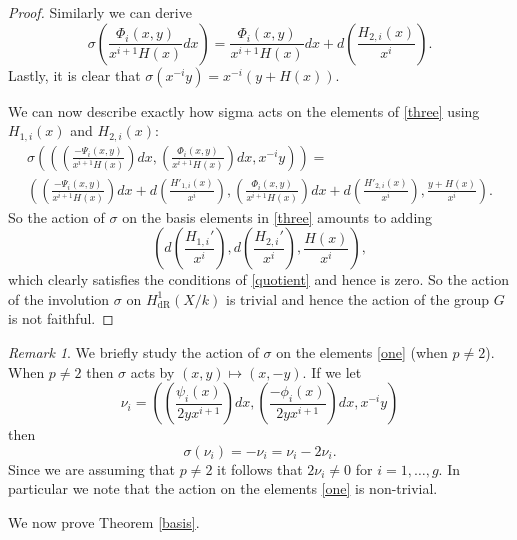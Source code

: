 \documentclass[draft, 11pt]{article} %
\theoremstyle{plain}
\theoremstyle{remark}
\newtheorem*{rem}{Remark}
\newcommand{\derhamhone}{H_{\text {dR}}^1(X/k)}
\begin{document}
\begin{proof}
Similarly we can derive
\begin{equation*}
\sigma \left( \frac{\Phi_i(x,y)}{x^{i+1}H(x)} dx \right)  = \frac{\Phi_i(x,y)}{x^{i+1}H(x)} dx + d \left( \frac{H_{2,i}(x)}{x^i} \right).
\end{equation*}
Lastly, it is clear that $\sigma(x^{-i}y) = x^{-i}(y+H(x))$.


We can now describe exactly how sigma acts on the elements of \eqref{three} using $H_{1,i}(x)$ and $H_{2,i}(x)$:
\begin{multline}
\sigma \left( \left( \left(\frac{-\Psi_i(x,y)}{x^{i+1}H(x)}\right) dx, \left( \frac{\Phi_i(x,y)}{x^{i+1}H(x)} \right) dx, x^{-i}y \right)\right) = \\
 \left( \left(\frac{-\Psi_i(x,y)}{x^{i+1}H(x)} \right) dx + d\left(\frac{H'_{1,i}(x)}{x^i}\right),  \left( \frac{\Phi_i(x,y)}{x^{i+1}H(x)} \right) dx+ d\left(\frac{H'_{2,i}(x)}{x^i} \right), \frac{y+H(x)}{x^i} \right).
\end{multline}
So the action of $\sigma$ on the basis elements in \eqref{three} amounts to adding 
\[
\left( d\left(\frac{H_{1,i}'}{x^i}\right), d\left(\frac{H_{2,i}'}{x^i}\right), \frac{H(x)}{x^i} \right),
\]
which clearly satisfies the conditions of \eqref{quotient} and hence is zero.
So the action of the involution $\sigma$ on $\derhamhone$ is trivial and hence the action of the group $G$ is not faithful.
\end{proof}

\begin{rem}
We briefly study the action of $\sigma$ on the elements \eqref{one} (when $p\neq 2$).
When $p \neq 2$ then $\sigma$ acts by $(x,y) \mapsto (x,-y)$.
If we let
\[
\nu_i = \left( \left( \frac{\psi_i(x)}{2yx^{i+1}}\right) dx, \left(\frac{-\phi_i(x)}{2yx^{i+1}}\right) dx, x^{-i}y\right)
\]
then 
\begin{equation}
\sigma(\nu_i) = -\nu_i = \nu_i - 2\nu_i.
\end{equation}
Since we are assuming that $p\neq 2$ it follows that $2\nu_i \neq 0$ for $i = 1, \ldots , g$.
In particular we note that the action on the elements \eqref{one} is non-trivial.
\end{rem}


We now prove Theorem \ref{basis}.
\end{document}
